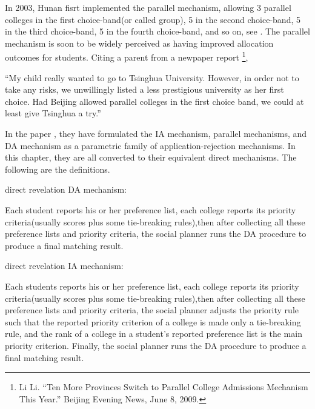 In 2003, Hunan fisrt implemented the parallel mechanism, allowing 3
parallel colleges in the first choice-band(or called group), 5 in the second choice-band, 5 in the third choice-band, 5 in the fourth choice-band, and so on, see \parencite{YanChenJPE}.  The parallel mechanism is soon to be widely perceived as having improved allocation outcomes for students. Citing a parent from a newpaper report \footnote{Li Li. “Ten More Provinces Switch to Parallel College Admissions Mechanism This Year.” Beijing Evening News,
June 8, 2009.},

``My child really wanted to go to Tsinghua University. However,  in order not to
take any risks, we unwillingly listed a less prestigious university as her first choice.
Had Beijing allowed parallel colleges in the first choice band, we could at least give
Tsinghua a try.''

In the paper \parencite{YanChenJPE}, they have formulated the IA
mechanism, parallel mechanisms, and DA mechanism as a parametric family
of application-rejection mechanisms. In this chapter, they are all
converted to their equivalent direct mechanisms. The following are the definitions.

\begin{definition*}direct revelation DA mechanism:
  
Each student reports his or her preference list, each college reports its priority criteria(usually scores plus some tie-breaking rules),then after collecting all these preference lists and priority criteria, the social planner runs the DA procedure
to produce a final matching result.
\end{definition*}

\begin{definition*}direct revelation IA mechanism:

Each students reports his or her preference list, each college reports its priority
criteria(usually scores plus some tie-breaking rules),then after
collecting all these preference lists and priority criteria, the
social planner adjusts the priority rule such that the reported
priority criterion of a college is made only a tie-breaking rule, and the rank of a college in a student's reported preference list is
the main priority criterion. Finally,
the social planner runs the DA procedure
to produce a final matching result.
\end{definition*}

